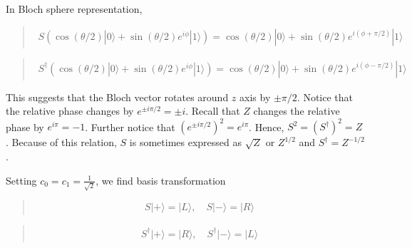 \documentclass[letterpaper,10pt,english]{jupyterBook}
\begin{document}
\sphinxAtStartPar
In Bloch sphere representation,
\begin{quote}
\begin{equation*}
\begin{split}
S \left( \cos(\theta/2)|0\rangle + \sin(\theta/2) e^{i\phi}|1\rangle\right) = \cos(\theta/2) |0\rangle + \sin(\theta/2) e^{i (\phi+\pi/2)} |1\rangle
\end{split}
\end{equation*}\end{quote}
\begin{quote}
\begin{equation*}
\begin{split}
S^\dagger \left( \cos(\theta/2)|0\rangle + \sin(\theta/2) e^{i\phi}|1\rangle\right) = \cos(\theta/2) |0\rangle + \sin(\theta/2) e^{i (\phi-\pi/2)} |1\rangle
\end{split}
\end{equation*}\end{quote}

\sphinxAtStartPar
This suggests that the Bloch vector rotates around \(z\) axis by \(\pm\pi/2\).
Notice that the relative phase changes by \(e^{\pm i\pi/2} = \pm i\).  Recall that \(Z\) changes the relative phase by \(e^{i \pi} = -1\). Further notice that \((e^{\pm i \pi/2})^2 = e^{i \pi}\).  Hence, \(S^2 = (S^\dagger)^2 = Z\).  Because of this relation,  \(S\) is sometimes expressed as \(\sqrt{Z}\) or \(Z^{1/2}\) and \(S^\dagger = Z^{-1/2}\).

\sphinxAtStartPar
Setting \(c_0=c_1=\frac{1}{\sqrt{2}}\), we find basis transformation
\begin{quote}
\begin{equation}\label{equation:q1gates/s:Sgate-fwd}
\begin{split}
S|+\rangle = |L\rangle, \quad S|-\rangle = |R\rangle
\end{split}
\end{equation}\end{quote}
\begin{quote}
\begin{equation}\label{equation:q1gates/s:SdgGate-fwd}
\begin{split}
S^\dagger|+\rangle = |R\rangle, \quad S^\dagger|-\rangle = |L\rangle
\end{split}
\end{equation}\end{quote}
\end{document}
